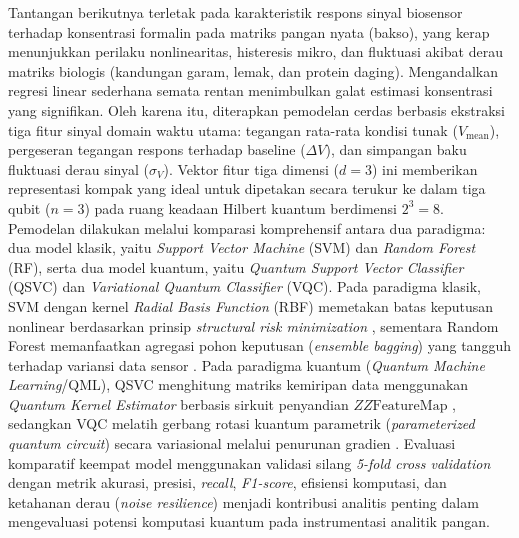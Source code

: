 Tantangan berikutnya terletak pada karakteristik respons sinyal biosensor terhadap konsentrasi formalin pada matriks pangan nyata (bakso), yang kerap menunjukkan perilaku nonlinearitas, histeresis mikro, dan fluktuasi akibat derau matriks biologis (kandungan garam, lemak, dan protein daging). Mengandalkan regresi linear sederhana semata rentan menimbulkan galat estimasi konsentrasi yang signifikan. Oleh karena itu, diterapkan pemodelan cerdas berbasis ekstraksi tiga fitur sinyal domain waktu utama: tegangan rata-rata kondisi tunak ($V_{\text{mean}}$), pergeseran tegangan respons terhadap baseline ($\Delta V$), dan simpangan baku fluktuasi derau sinyal ($\sigma_V$). Vektor fitur tiga dimensi ($d=3$) ini memberikan representasi kompak yang ideal untuk dipetakan secara terukur ke dalam tiga qubit ($n=3$) pada ruang keadaan Hilbert kuantum berdimensi $2^3 = 8$. Pemodelan dilakukan melalui komparasi komprehensif antara dua paradigma: dua model klasik, yaitu \textit{Support Vector Machine} (SVM) dan \textit{Random Forest} (RF), serta dua model kuantum, yaitu \textit{Quantum Support Vector Classifier} (QSVC) dan \textit{Variational Quantum Classifier} (VQC). Pada paradigma klasik, SVM dengan kernel \textit{Radial Basis Function} (RBF) memetakan batas keputusan nonlinear berdasarkan prinsip \textit{structural risk minimization} \cite{cortes1995support}, sementara Random Forest memanfaatkan agregasi pohon keputusan (\textit{ensemble bagging}) yang tangguh terhadap variansi data sensor \cite{Breiman2001,Tyralis2019}. Pada paradigma kuantum (\textit{Quantum Machine Learning}/QML), QSVC menghitung matriks kemiripan data menggunakan \textit{Quantum Kernel Estimator} berbasis sirkuit penyandian $ZZ\text{FeatureMap}$ \cite{havlicek2019supervised,schuld2019quantum}, sedangkan VQC melatih gerbang rotasi kuantum parametrik (\textit{parameterized quantum circuit}) secara variasional melalui penurunan gradien \cite{schuld2019quantum}. Evaluasi komparatif keempat model menggunakan validasi silang \textit{5-fold cross validation} dengan metrik akurasi, presisi, \textit{recall}, \textit{F1-score}, efisiensi komputasi, dan ketahanan derau (\textit{noise resilience}) menjadi kontribusi analitis penting dalam mengevaluasi potensi komputasi kuantum pada instrumentasi analitik pangan.

